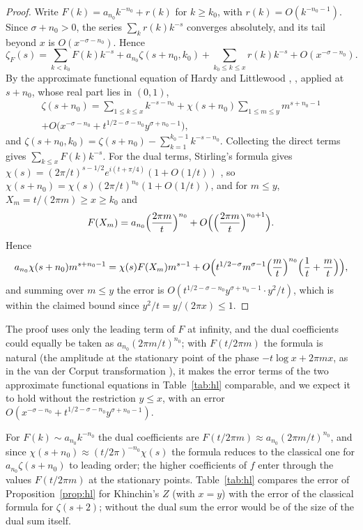 \documentclass[11pt,reqno]{amsart}
\theoremstyle{definition}
\theoremstyle{remark}
\begin{document}
\begin{proof}
Write $F(k) = a_{n_0}k^{-n_0} + r(k)$ for $k \ge k_0$, with $r(k) = O(k^{-n_0-1})$. Since $\sigma + n_0 > 0$, the series
$\sum_kr(k)k^{-s}$ converges absolutely, and its tail beyond $x$ is $O(x^{-\sigma-n_0})$. Hence
\[
  \zeta_F(s) = \sum_{k<k_0}F(k)k^{-s} + a_{n_0}\zeta(s+n_0,k_0) + \sum_{k_0\le k\le x}r(k)k^{-s} + O(x^{-\sigma-n_0}).
\]
By the approximate functional equation of Hardy and Littlewood \cite{HL23}, \cite[Theorem~4.13]{Tit86}, applied at
$s + n_0$, whose real part lies in $(0,1)$,
\begin{multline*}
  \zeta(s+n_0) = \sum_{1\le k\le x}k^{-s-n_0} + \chi(s+n_0)\sum_{1\le m\le y}m^{s+n_0-1} \\
  + O\bigl(x^{-\sigma-n_0} + t^{1/2-\sigma-n_0}y^{\sigma+n_0-1}\bigr),
\end{multline*}
and $\zeta(s+n_0,k_0) = \zeta(s+n_0) - \sum_{k=1}^{k_0-1}k^{-s-n_0}$. Collecting the direct terms gives
$\sum_{k\le x}F(k)k^{-s}$. For the dual terms, Stirling's formula gives
$\chi(s) = (2\pi/t)^{s-1/2}e^{i(t+\pi/4)}(1 + O(1/t))$ \cite[(4.12.3)]{Tit86}, so
$\chi(s+n_0) = \chi(s)(2\pi/t)^{n_0}(1 + O(1/t))$, and for $m \le y$, $X_m = t/(2\pi m) \ge x \ge k_0$ and
\[
  F(X_m) = a_{n_0}\Bigl(\frac{2\pi m}{t}\Bigr)^{n_0} + O\Bigl(\Bigl(\frac{2\pi m}{t}\Bigr)^{n_0+1}\Bigr).
\]
Hence
\[
  a_{n_0}\chi(s+n_0)m^{s+n_0-1} = \chi(s)F(X_m)m^{s-1}
  + O\Bigl(t^{1/2-\sigma}m^{\sigma-1}\Bigl(\frac mt\Bigr)^{n_0}\Bigl(\frac1t + \frac mt\Bigr)\Bigr),
\]
and summing over $m \le y$ the error is $O(t^{1/2-\sigma-n_0}y^{\sigma+n_0-1}\cdot y^2/t)$, which is within the claimed
bound since $y^2/t = y/(2\pi x) \le 1$.
\end{proof}

The proof uses only the leading term of $F$ at infinity, and the dual coefficients could equally be taken as
$a_{n_0}(2\pi m/t)^{n_0}$; with $F(t/2\pi m)$ the formula is natural (the amplitude at the stationary point of the phase
$-t\log x + 2\pi mx$, as in the van der Corput transformation \cite[Lemma~4.10]{Tit86}), it makes the error terms of
the two approximate functional equations in Table~\ref{tab:hl} comparable, and we expect it to hold without the
restriction $y \le x$, with an error $O(x^{-\sigma-n_0} + t^{1/2-\sigma-n_0}y^{\sigma+n_0-1})$.

For $F(k) \sim a_{n_0}k^{-n_0}$ the dual coefficients are $F(t/2\pi m) \approx a_{n_0}(2\pi m/t)^{n_0}$, and since
$\chi(s+n_0) \approx (t/2\pi)^{-n_0}\chi(s)$ the formula reduces to the classical one for $a_{n_0}\zeta(s+n_0)$ to
leading order; the higher coefficients of $f$ enter through the values $F(t/2\pi m)$ at the stationary points.
Table~\ref{tab:hl} compares the error of Proposition~\ref{prop:hl} for Khinchin's $Z$ (with $x = y$) with the
error of the classical formula for $\zeta(s+2)$; without the dual sum the error would be of the size of the
dual sum itself.
\end{document}
